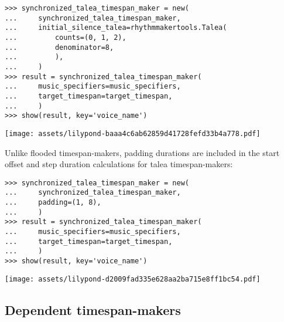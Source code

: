 \begin{singlespacing}
\vspace{-0.5\baselineskip}
\begin{lstlisting}
>>> synchronized_talea_timespan_maker = new(
...     synchronized_talea_timespan_maker,
...     initial_silence_talea=rhythmmakertools.Talea(
...         counts=(0, 1, 2),
...         denominator=8,
...         ),
...     )
>>> result = synchronized_talea_timespan_maker(
...     music_specifiers=music_specifiers,
...     target_timespan=target_timespan,
...     )
>>> show(result, key='voice_name')
\end{lstlisting}
\noindent\texttt{[image: assets/lilypond-baaa4c6ab62859d41728fefd33b4a778.pdf]}
\end{singlespacing}

\noindent Unlike flooded timespan-makers, padding durations are included in the
start offset and step duration calculations for talea timespan-makers:

\begin{comment}
<abjad>
synchronized_talea_timespan_maker = new(
    synchronized_talea_timespan_maker,
    padding=(1, 8),
    )
result = synchronized_talea_timespan_maker(
    music_specifiers=music_specifiers,
    target_timespan=target_timespan,
    )
show(result, key='voice_name')
</abjad>
\end{comment}

\begin{singlespacing}
\vspace{-0.5\baselineskip}
\begin{lstlisting}
>>> synchronized_talea_timespan_maker = new(
...     synchronized_talea_timespan_maker,
...     padding=(1, 8),
...     )
>>> result = synchronized_talea_timespan_maker(
...     music_specifiers=music_specifiers,
...     target_timespan=target_timespan,
...     )
>>> show(result, key='voice_name')
\end{lstlisting}
\noindent\texttt{[image: assets/lilypond-d2009fad335e628aa2ba715e8ff1bc54.pdf]}
\end{singlespacing}

\subsection{Dependent timespan-makers} %
\label{ssec:dependent-timespan-makers}


